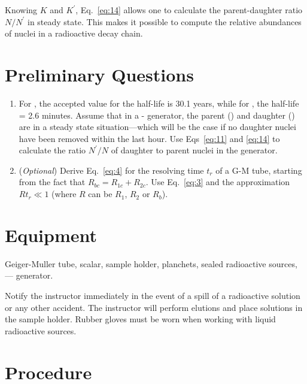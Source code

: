 Knowing $K$ and $K^\prime$, Eq.~\ref{eq:14} allows one to calculate the
parent-daughter ratio $N/N^\prime$ in steady state.  This
makes it possible to compute the relative abundances of nuclei in a
radioactive decay chain.

\section{Preliminary Questions}

\begin{enumerate}
\item For \cs, the accepted value for the half-life is 30.1 years, while for
  \bam, the half-life = 2.6 minutes.  Assume that in a \cs-\bam{} generator, the
  parent (\cs) and daughter (\bam) are in a steady state situation---which will
  be the case if no daughter nuclei have been removed within the last hour. Use
  Eqs~\ref{eq:11} and \ref{eq:14} to calculate the ratio $N^\prime/N$ of
  daughter to parent nuclei in the generator.

\item ({\em Optional}) 
  Derive Eq.~\ref{eq:4} for the resolving time $t_r$ of a G-M tube, starting
  from the fact that $R_{bc } = R_{1c } + R_{2c }$.  Use Eq.~\ref{eq:3} and the
  approximation $Rt_{r} \ll 1$ (where $R$ can be $R_{1}$, $R_{2}$ or
  $R_{b}$).
\end{enumerate}

\section{Equipment}
Geiger-Muller tube, scalar, sample holder, planchets,
sealed radioactive sources, \cs --- \bam generator.

\bigskip


Notify the instructor immediately in the event of a spill of a radioactive
solution or any other accident.  The instructor will perform elutions
and place solutions in the sample holder.  Rubber gloves must be worn
when working with liquid radioactive sources.

\section{Procedure}

